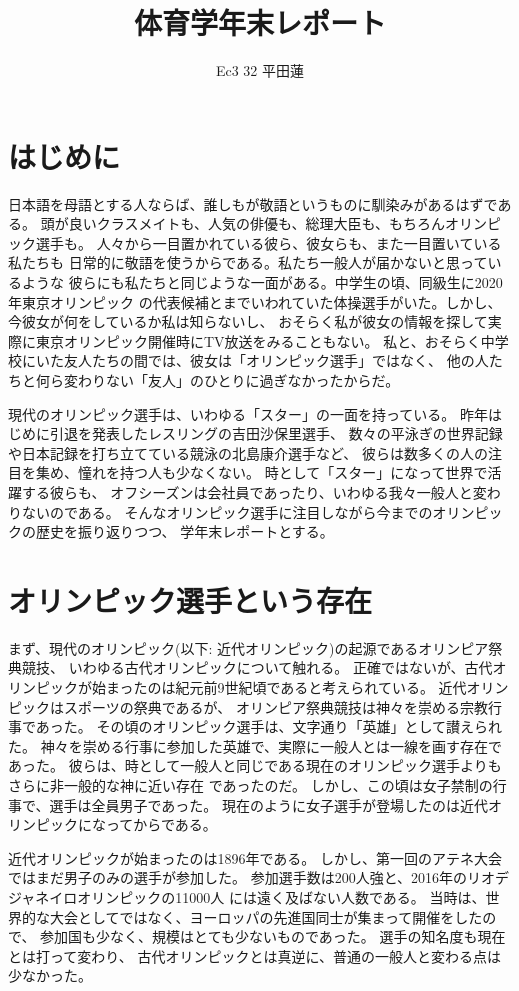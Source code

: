 \documentclass[]{jsarticle}
\title{体育学年末レポート}
\author{Ec3 32 平田蓮}
\date{}
\begin{document}
\maketitle
\section{はじめに}
日本語を母語とする人ならば、誰しもが敬語というものに馴染みがあるはずである。
頭が良いクラスメイトも、人気の俳優も、総理大臣も、もちろんオリンピック選手も。
人々から一目置かれている彼ら、彼女らも、また一目置いている私たちも
日常的に敬語を使うからである。私たち一般人が届かないと思っているような
彼らにも私たちと同じような一面がある。中学生の頃、同級生に2020年東京オリンピック
の代表候補とまでいわれていた体操選手がいた。しかし、今彼女が何をしているか私は知らないし、
おそらく私が彼女の情報を探して実際に東京オリンピック開催時にTV放送をみることもない。
私と、おそらく中学校にいた友人たちの間では、彼女は「オリンピック選手」ではなく、
他の人たちと何ら変わりない「友人」のひとりに過ぎなかったからだ。

現代のオリンピック選手は、いわゆる「スター」の一面を持っている。
昨年はじめに引退を発表したレスリングの吉田沙保里選手、
数々の平泳ぎの世界記録や日本記録を打ち立てている競泳の北島康介選手など、
彼らは数多くの人の注目を集め、憧れを持つ人も少なくない。
時として「スター」になって世界で活躍する彼らも、
オフシーズンは会社員であったり、いわゆる我々一般人と変わりないのである。
そんなオリンピック選手に注目しながら今までのオリンピックの歴史を振り返りつつ、
学年末レポートとする。

\section{オリンピック選手という存在}
まず、現代のオリンピック(以下: 近代オリンピック)の起源であるオリンピア祭典競技、
いわゆる古代オリンピックについて触れる。
正確ではないが、古代オリンピックが始まったのは紀元前9世紀頃であると考えられている。
近代オリンピックはスポーツの祭典であるが、
オリンピア祭典競技は神々を崇める宗教行事であった。
その頃のオリンピック選手は、文字通り「英雄」として讃えられた。
神々を崇める行事に参加した英雄で、実際に一般人とは一線を画す存在であった。
彼らは、時として一般人と同じである現在のオリンピック選手よりもさらに非一般的な神に近い存在
であったのだ。
しかし、この頃は女子禁制の行事で、選手は全員男子であった。
現在のように女子選手が登場したのは近代オリンピックになってからである。

近代オリンピックが始まったのは1896年である。
しかし、第一回のアテネ大会ではまだ男子のみの選手が参加した。
参加選手数は200人強と、2016年のリオデジャネイロオリンピックの11000人
には遠く及ばない人数である。
当時は、世界的な大会としてではなく、ヨーロッパの先進国同士が集まって開催をしたので、
参加国も少なく、規模はとても少ないものであった。
選手の知名度も現在とは打って変わり、
古代オリンピックとは真逆に、普通の一般人と変わる点は少なかった。
\end{document}
